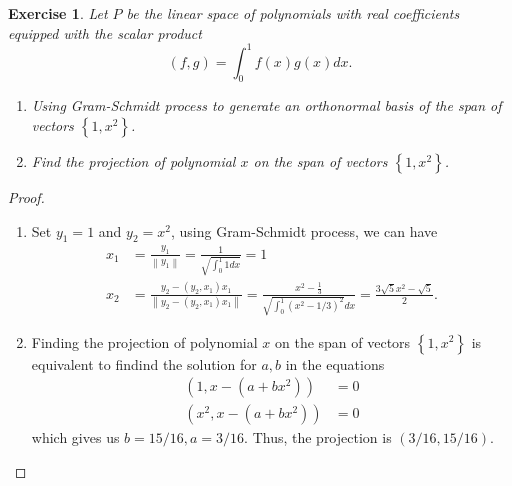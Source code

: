 \documentclass[10pt]{book}
\newtheorem{exercise}{Exercise}[section]
\theoremstyle{definition}
\numberwithin{equation}{chapter}
\begin{document}
\begin{exercise}
Let $P$ be the linear space of polynomials with real coefficients
equipped with the scalar product%
$$
\left(  f,g\right)  =\int_{0}^{1}f\left(  x\right)  g\left(  x\right)  dx.
$$
\begin{enumerate}[label=(\alph*)]
    \item Using Gram-Schmidt process to generate an orthonormal basis of the span of vectors $\left\{  1,x^{2}\right\}$.
    \item Find the projection of polynomial $x$ on the span of vectors $\left\{  1,x^{2}\right\}$.
\end{enumerate}
\end{exercise}
\begin{proof}
~\begin{enumerate}[label=(\alph*)]
    \item Set $y_1 = 1$ and $y_2 = x^2$, using Gram-Schmidt process, we can have 
    \begin{align*}
        x_1 & = \frac{y_1}{\left \|y_1\right \|} = \frac{1}{\sqrt{\int^1_0 1dx}} = 1 \\
        x_2 & = \frac{y_2-(y_2,x_1)x_1}{\left \|y_2-(y_2,x_1)x_1\right \|} = \frac{x^2 - \frac{1}{3}}{\sqrt{\int^1_0 (x^2 - 1/3)^2}dx} = \frac{3\sqrt{5}x^2 - \sqrt{5}}{2}.
    \end{align*}
    \item Finding the projection of polynomial $x$ on the span of vectors $\left\{  1,x^{2}\right\}$ is equivalent to findind the solution for $a,b$ in the equations
    \begin{align*}
        (1,x-(a+bx^2)) & = 0 \\
        (x^2,x-(a+bx^2)) & = 0 
    \end{align*}
    which gives us $b = 15/16, a = 3/16$. Thus, the projection is $\left(3/16,15/16\right)$.
\end{enumerate}
\end{proof}

\medskip
\end{document}
